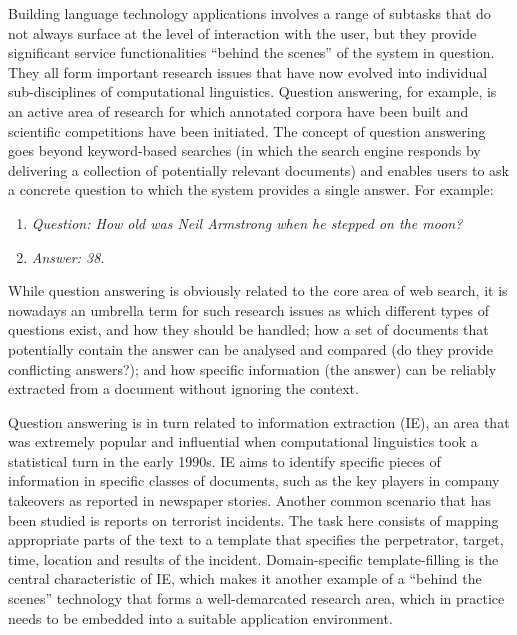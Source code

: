 \begin{multicols}{2}
Building language technology applications involves a range of subtasks that do not always surface at the level of interaction with the user, but they provide significant service functionalities “behind the scenes” of the system in question. They all form important research issues that have now evolved into individual sub-disciplines of computational linguistics.  Question answering, for example, is an active area of research for which annotated corpora have been built and scientific competitions have been initiated. The concept of question answering goes beyond keyword-based searches (in which the search engine responds by delivering a collection of potentially relevant documents) and enables users to ask a concrete question to which the system provides a single answer. For example:
\begin{enumerate}
\item[]\textit{Question: How old was Neil Armstrong when he stepped on the moon?}
\item[]\textit{Answer: 38.}
\end{enumerate}
While question answering is obviously related to the core area of web search, it is nowadays an umbrella term for such research issues as which different types of questions exist, and how they should be handled; how a set of documents that potentially contain the answer can be analysed and compared (do they provide conflicting answers?); and how specific information (the answer) can be reliably extracted from a document without ignoring the context. 


Question answering is in turn related to information extraction (IE), an area that was extremely popular and influential when computational linguistics took a statistical turn in the early 1990s. IE aims to identify specific pieces of information in specific classes of documents, such as the key players in company takeovers as reported in newspaper stories. Another common scenario that has been studied is reports on terrorist incidents. The task here consists of mapping appropriate parts of the text to a template that specifies the perpetrator, target, time, location and results of the incident. Domain-specific template-filling is the central characteristic of IE, which makes it another example of a “behind the scenes” technology that forms a well-demarcated research area, which in practice needs to be embedded into a suitable application environment. 


\end{multicols}
